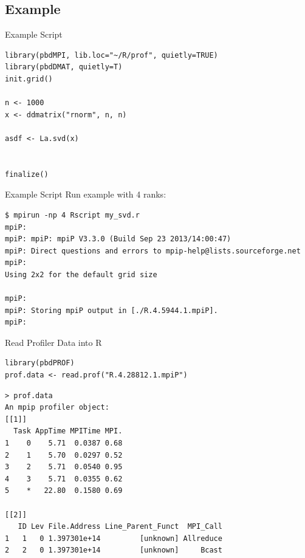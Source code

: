 \subsection{Example}
\makesubcontentsslidessec


\begin{frame}[fragile]
  \begin{block}{Example Script}
\begin{lstlisting}[title=my\_svd.r]
library(pbdMPI, lib.loc="~/R/prof", quietly=TRUE)
library(pbdDMAT, quietly=T)
init.grid()

n <- 1000
x <- ddmatrix("rnorm", n, n)

asdf <- La.svd(x)


finalize()
\end{lstlisting}
  \end{block}
\end{frame}

\begin{frame}[fragile]
  \begin{block}{Example Script}
Run example with 4 ranks:
\begin{lstlisting}[language=shl]
$ mpirun -np 4 Rscript my_svd.r
mpiP: 
mpiP: mpiP: mpiP V3.3.0 (Build Sep 23 2013/14:00:47)
mpiP: Direct questions and errors to mpip-help@lists.sourceforge.net
mpiP: 
Using 2x2 for the default grid size

mpiP: 
mpiP: Storing mpiP output in [./R.4.5944.1.mpiP].
mpiP: 
\end{lstlisting}
  \end{block}
\end{frame}



\begin{frame}[fragile]
  \begin{block}{Read Profiler Data into R}
\vspace{-.2cm}
\begin{lstlisting}[title=Interactively (or in batch) Read in Profiler Data]
library(pbdPROF)
prof.data <- read.prof("R.4.28812.1.mpiP") 
\end{lstlisting}
\vspace{-.2cm}
\begin{lstlisting}[language=shl,title=Partial Output of Example Data]
> prof.data
An mpip profiler object:
[[1]]
  Task AppTime MPITime MPI.
1    0    5.71  0.0387 0.68
2    1    5.70  0.0297 0.52
3    2    5.71  0.0540 0.95
4    3    5.71  0.0355 0.62
5    *   22.80  0.1580 0.69

[[2]]
   ID Lev File.Address Line_Parent_Funct  MPI_Call
1   1   0 1.397301e+14         [unknown] Allreduce
2   2   0 1.397301e+14         [unknown]     Bcast
\end{lstlisting}
  \end{block}
\end{frame}



